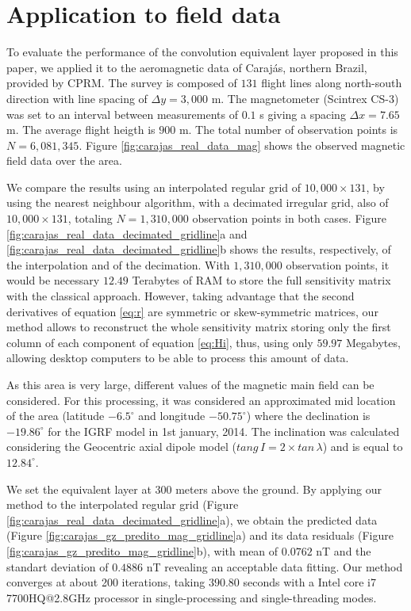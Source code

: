 \section{Application to field data}

To evaluate the performance of the convolution equivalent layer proposed in this paper, we applied it to the aeromagnetic data of Carajás, northern Brazil, provided by CPRM.
The survey is composed of $131$ flight lines along north-south direction with line spacing of 
$\Delta y = 3,000$ m. 
The magnetometer (Scintrex CS-3) was set to an interval between measurements of $0.1$ s giving a spacing $\Delta x = 7.65$ m. The average flight heigth is $900$ m. The total number of observation points is $N = 6,081,345$. Figure \ref{fig:carajas_real_data_mag} shows the observed magnetic field data over the area.

We compare the results using an interpolated regular grid of $10,000 \times 131$, by using the nearest neighbour algorithm, with a decimated irregular grid, also of $10,000 \times 131$, totaling $N = 1,310,000$ observation points in both cases. 
Figure \ref{fig:carajas_real_data_decimated_gridline}a and \ref{fig:carajas_real_data_decimated_gridline}b shows the results, respectively, of the interpolation and of the decimation. 
With $1,310,000$ observation points, it would be necessary $12.49$ Terabytes of RAM to store the full sensitivity matrix with the classical approach. 
However, taking advantage that the second derivatives of equation \ref{eq:r} are symmetric or skew-symmetric matrices, our method allows to reconstruct the whole sensitivity matrix storing only the first column of each component of equation \ref{eq:Hi}, thus, using only $59.97$ Megabytes, allowing desktop computers to be able to process this amount of data.

As this area is very large, different values of the magnetic main field can be considered. 
For this processing, it was considered an approximated mid location of the area (latitude $-6.5^{\circ}$ and longitude $-50.75^{\circ}$) where the declination is $-19.86^{\circ}$ for the IGRF model in 1st january, 2014. The inclination was calculated considering the Geocentric axial dipole model ($tang \, I = 2 \times tan \, \lambda$) and is equal to $12.84^{\circ}$. 

We set the equivalent layer at $300$ meters above the ground.
By applying our method to the interpolated regular grid 
(Figure \ref{fig:carajas_real_data_decimated_gridline}a), we obtain the  predicted data 
(Figure \ref{fig:carajas_gz_predito_mag_gridline}a) and its data residuals 
(Figure \ref{fig:carajas_gz_predito_mag_gridline}b), with mean of $0.0762$ nT and the standart deviation of $0.4886$ nT  revealing an acceptable data fitting.
Our method converges at about 200 iterations,  taking $390.80$ seconds with a Intel core i7 7700HQ@2.8GHz processor in single-processing and single-threading modes. 

